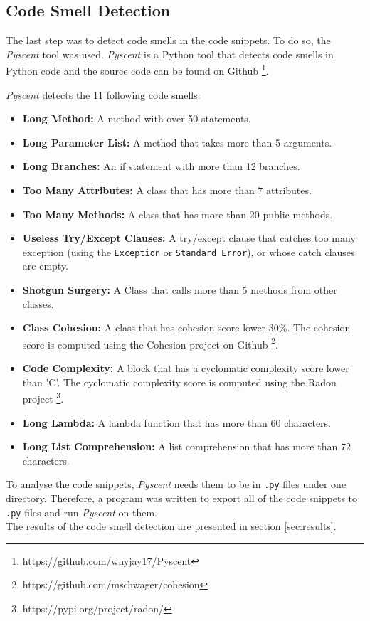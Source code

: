 \subsection{Code Smell Detection}
The last step was to detect code smells in the code snippets. To do so, the \textit{Pyscent}  tool was used. \textit{Pyscent}  is a Python tool that detects code smells in Python code and the source code can be found on Github \footnote{https://github.com/whyjay17/Pyscent}.

\newpage

\textit{Pyscent} detects the 11 following code smells:

\begin{itemize}
    \item \textbf{Long Method:} A method with over 50 statements.

    \item \textbf{Long Parameter List:} A method that takes more than 5 arguments.

    \item \textbf{Long Branches: } An if statement with more than 12 branches.

    \item \textbf{Too Many Attributes:} A class that has more than 7 attributes.

    \item \textbf{Too Many Methods:} A class that has more than 20 public methods.

    \item \textbf{Useless Try/Except Clauses: } A try/except clause that catches too many exception (using the \texttt{Exception} or \texttt{Standard Error}), or whose catch clauses are empty.

    \item \textbf{Shotgun Surgery: } A Class that calls more than 5 methods from other classes.

    \item \textbf{Class Cohesion: } A class that has cohesion score lower 30\%. The cohesion score is computed using the Cohesion project on Github \footnote{https://github.com/mschwager/cohesion}.

    \item \textbf{Code Complexity: } A block that has a cyclomatic complexity score lower than 'C'. The cyclomatic complexity score is computed using the Radon project \footnote{https://pypi.org/project/radon/}.

    \item \textbf{Long Lambda: } A lambda function that has more than 60 characters.

    \item \textbf{Long List Comprehension: } A list comprehension that has more than 72 characters.

\end{itemize}

To analyse the code snippets, \textit{Pyscent} needs them to be in \texttt{.py} files under one directory. Therefore, a program was written to export all of the code snippets to \texttt{.py} files and run \textit{Pyscent} on them. \\

The results of the code smell detection are presented in section \ref{sec:results}.